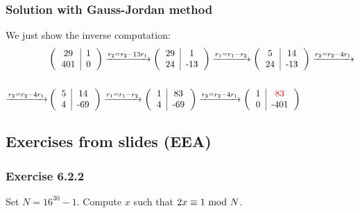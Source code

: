 \subsubsection*{Solution with Gauss-Jordan method}
We just show the inverse computation:
\begin{align*}
    &\left(\begin{tabular}{c|c}
        29&1\\
        401&0
    \end{tabular}\right)\xrightarrow[]{r_2=r_2-13r_1}
    \left(\begin{tabular}{c|c}
        29&1\\
        24&-13
    \end{tabular}\right)\xrightarrow[]{r_1=r_1-r_2}
    \left(\begin{tabular}{c|c}
        5&14\\
        24&-13
    \end{tabular}\right)\xrightarrow[]{r_2=r_2-4r_1}\\\\\xrightarrow[]{r_2=r_2-4r_1}
    &\left(\begin{tabular}{c|c}
        5&14\\
        4&-69
    \end{tabular}\right)\xrightarrow[]{r_1=r_1-r_2}
    \left(\begin{tabular}{c|c}
        1&83\\
        4&-69
    \end{tabular}\right)\xrightarrow[]{r_2=r_2-4r_1}
    \left(\begin{tabular}{c|c}
        1&\textcolor{red}{83}\\
        0&-401
    \end{tabular}\right)
\end{align*}

\newpage
\subsection{Exercises from slides (EEA)}
\subsubsection{Exercise 6.2.2}
Set $N=16^{30}-1$. Compute $x$ such that $2x\equiv1\text{ mod } N$.

